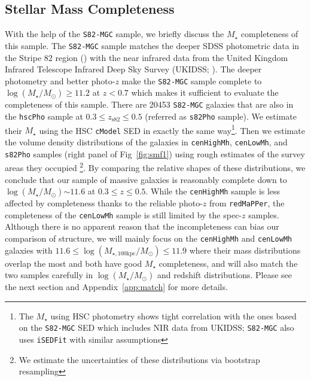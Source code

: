 \documentclass[a4paper,fleqn,usenatbib]{mnras}
\def\redm{\texttt{redMaPPer}}
\def\rbcg{\texttt{cenHighMh}}
\def\nbcg{\texttt{cenLowMh}}
\def\mstar{{$M_{\star}$}}
\def\logms{{$\log (M_{\star}/M_{\odot})$}}
\def\logmtot{{$\log (M_{\star,100\mathrm{kpc}}/M_{\odot})$}}
\begin{document}
    \subsection{Stellar Mass Completeness}
    \label{ssec:complete}
    
    With the help of the \texttt{S82-MGC} sample, we briefly discuss the \mstar{} 
    completeness of this sample. 
    The \texttt{S82-MGC} sample matches the deeper SDSS photometric data in the 
    Stripe 82 region (\citealt{Annis2014}) with the near infrared data from the United 
    Kingdom Infrared Telescope Infrared Deep Sky Survey (UKIDSS; \citealt{Lawrence2007}). 
    The deeper photometry and better photo-$z$ make the \texttt{S82-MGC} sample complete 
    to \logms{}$\geq 11.2$ at $z<0.7$ which makes it sufficient to evaluate the 
    completeness of this sample.
    There are 20453 \texttt{S82-MGC} galaxies that are also in the \texttt{hscPho} 
    sample at $0.3 \leq z_{\mathrm{s82}} \leq 0.5$ (referred as \texttt{s82Pho} sample).   
    We estimate their \mstar{} using the HSC \texttt{cModel} SED in exactly the 
    same way\footnote{The \mstar{} using HSC photometry shows tight correlation with the 
    ones based on the \texttt{S82-MGC} SED which includes NIR data from UKIDSS; 
    \texttt{S82-MGC} also uses \texttt{iSEDFit} with similar assumptions}.  
    Then we estimate the volume density distributions of the galaxies in \rbcg{}, 
    \nbcg{}, and \texttt{s82Pho} samples (right panel of Fig~\ref{fig:smf1}) using 
    rough estimates of the survey areas they occupied \footnote{We estimate the 
    uncertainties of these distributions via bootstrap resampling}.
    By comparing the relative shapes of these distributions, we conclude that 
    our sample of massive galaxies is reasonably complete down to \logms{}$\sim 11.6$
    at $0.3 \leq z \leq 0.5$. 
    While the \rbcg{} sample is less affected by completeness thanks to the reliable
    photo-$z$ from \redm{}, the completeness of the \nbcg{} sample is still limited 
    by the spec-$z$ samples.
    Although there is no apparent reason that the incompleteness can bias our 
    comparison of structure, we will mainly focus on the \rbcg{} and \nbcg{} galaxies 
    with $11.6 \le$\logmtot{}$\le 11.9$ where their mass distributions overlap the 
    most and both have good \mstar{} completeness, and will also match the two samples 
    carefully in \logms{} and redshift distributions.
    Please see the next section and Appendix~\ref{app:match} for more details.
\end{document}
